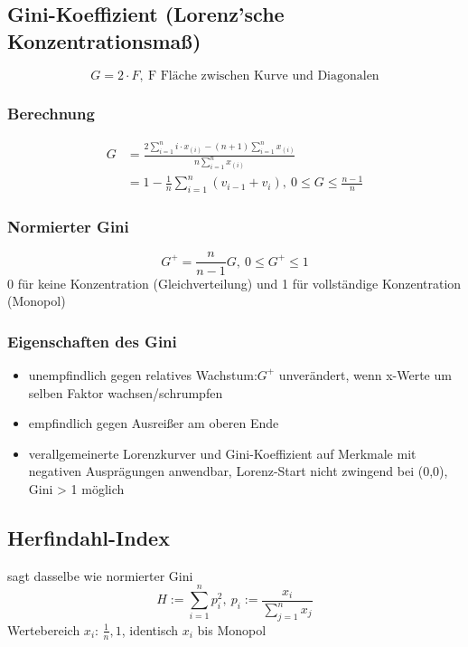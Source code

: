 \documentclass[10pt,a4paper,landscape]{article}
\begin{document}
\begin{multicols}{4}
\subsection{Gini-Koeffizient (Lorenz'sche Konzentrationsmaß)}
\[
G = 2 \cdot F, ~\text{F Fläche zwischen Kurve und Diagonalen}
\]

\subsubsection*{Berechnung}
\begin{align*}
G &= \frac{ 2\sum_{i=1}^n i \cdot x_{(i)} -(n+1) \sum_{i=1}^nx_{(i)} }{n\sum_{i=1}^n x_{(i)}} \\
&= 1 - \frac{1}{n}\sum_{i=1}^n(v_{i-1}+v_i), ~0\leq G \leq \frac{n-1}{n}
\end{align*}

\subsubsection*{Normierter Gini}
\[
G^+ = \frac{n}{n-1}G, ~0 \leq G^+ \leq 1
\]
0 für keine Konzentration (Gleichverteilung) und 1 für vollständige Konzentration (Monopol)

\subsubsection*{Eigenschaften des Gini}
\begin{itemize}
\item unempfindlich gegen relatives Wachstum:$G^+$ unverändert, wenn x-Werte um selben Faktor wachsen/schrumpfen
\item empfindlich gegen Ausreißer am oberen Ende
\item verallgemeinerte Lorenzkurver und Gini-Koeffizient auf Merkmale mit negativen Ausprägungen anwendbar, Lorenz-Start nicht zwingend bei (0,0), Gini > 1 möglich
\end{itemize}

\subsection{Herfindahl-Index}
sagt dasselbe wie normierter Gini
\[
H:=\sum_{i=1}^np_i^2, ~p_i:=\frac{x_i}{\sum_{j=1}^nx_j}
\]
Wertebereich $x_i$: $\frac{1}{n}, 1$, identisch $x_i$ bis Monopol



\end{multicols}
\end{document}
